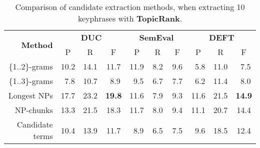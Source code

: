       \begin{table}
        \centering
        \begin{tabular}{rccccccccc}
          \toprule
          \multirow{2}{*}[-2pt]{\textbf{Method}} & \multicolumn{3}{c}{\textbf{DUC}} & \multicolumn{3}{c}{\textbf{SemEval}} & \multicolumn{3}{c}{\textbf{DEFT}}\\
          \cmidrule(r){2-4}\cmidrule(lr){5-7}\cmidrule(l){8-10}
          & P & R & F & P & R & F & P & R & F\\
          \midrule
          \{1..2\}-grams & 10.2 & 14.1 & 11.7 & 11.9 & $~~$8.2 & $~~$9.6 & $~~$5.8 & 11.0 & $~~$7.5\\
          \{1..3\}-grams & $~~$7.8 & 10.7 & $~~$8.9 & $~~$9.5 & $~~$6.7 & $~~$7.7 & $~~$6.2 & 11.4 & $~~$8.0\\
          Longest NPs & 17.7 & 23.2 & \textbf{19.8} & 11.6 & $~~$7.9 & $~~$9.3 & 11.6 & 21.5 & \textbf{14.9}\\
          NP-chunks & 13.3 & 21.5 & 18.3 & 11.7 & $~~$8.0 & $~~$9.4 & 11.1 & 20.7 & 14.4\\
          Candidate terms & 10.4 & 13.9 & 11.7 & $~~$8.9 & $~~$6.5 & $~~$7.5 & $~~$9.6 & 18.5 & 12.4\\
          \bottomrule
        \end{tabular}
        \caption{Comparison of candidate extraction methods, when extracting 10
                 keyphrases with \textbf{TopicRank}.
                 \label{tab:topicrank_results}}
      \end{table}
